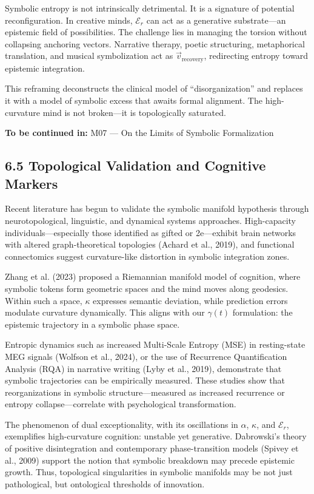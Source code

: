 Symbolic entropy is not intrinsically detrimental. It is a signature of potential reconfiguration. In creative minds, $\mathcal{E}_r$ can act as a generative substrate—an epistemic field of possibilities. The challenge lies in managing the torsion without collapsing anchoring vectors. Narrative therapy, poetic structuring, metaphorical translation, and musical symbolization act as $\vec{v}_{\text{recovery}}$, redirecting entropy toward epistemic integration.

This reframing deconstructs the clinical model of “disorganization” and replaces it with a model of symbolic excess that awaits formal alignment. The high-curvature mind is not broken—it is topologically saturated.

\bigskip
\noindent
\textbf{To be continued in:} M07 — On the Limits of Symbolic Formalization


\subsection*{6.5 Topological Validation and Cognitive Markers}

Recent literature has begun to validate the symbolic manifold hypothesis through neurotopological, linguistic, and dynamical systems approaches. High-capacity individuals—especially those identified as gifted or 2e—exhibit brain networks with altered graph-theoretical topologies (Achard et al., 2019)\cite{Achard2019}, and functional connectomics suggest curvature-like distortion in symbolic integration zones.

Zhang et al. (2023)\cite{Zhang2023} proposed a Riemannian manifold model of cognition, where symbolic tokens form geometric spaces and the mind moves along geodesics. Within such a space, $\kappa$ expresses semantic deviation, while prediction errors modulate curvature dynamically. This aligns with our $\gamma(t)$ formulation: the epistemic trajectory in a symbolic phase space.

Entropic dynamics such as increased Multi-Scale Entropy (MSE) in resting-state MEG signals (Wolfson et al., 2024)\cite{Wolfson2024}, or the use of Recurrence Quantification Analysis (RQA) in narrative writing (Lyby et al., 2019)\cite{Lyby2019}, demonstrate that symbolic trajectories can be empirically measured. These studies show that reorganizations in symbolic structure—measured as increased recurrence or entropy collapse—correlate with psychological transformation.

The phenomenon of dual exceptionality, with its oscillations in $\alpha$, $\kappa$, and $\mathcal{E}_r$, exemplifies high-curvature cognition: unstable yet generative. Dabrowski's theory of positive disintegration and contemporary phase-transition models (Spivey et al., 2009)\cite{Spivey2009} support the notion that symbolic breakdown may precede epistemic growth. Thus, topological singularities in symbolic manifolds may be not just pathological, but ontological thresholds of innovation.

